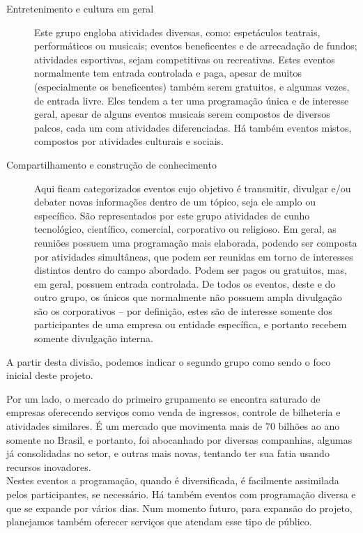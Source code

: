 \documentclass[12pt,a4paper,twoside,hyphens,english,brazil]{abntex2}
\begin{document}
\begin{description}
	\item[Entretenimento e cultura em geral]
	Este grupo engloba atividades diversas, como: espetáculos teatrais, performáticos ou musicais; eventos beneficentes e de arrecadação de fundos; atividades esportivas, sejam competitivas ou recreativas. Estes eventos normalmente tem entrada controlada e paga, apesar de muitos (especialmente os beneficentes) também serem gratuitos, e algumas vezes, de entrada livre. Eles tendem a ter uma programação única e de interesse geral, apesar de alguns eventos musicais serem compostos de diversos palcos, cada um com atividades diferenciadas. Há também eventos mistos, compostos por atividades culturais e sociais.

	\item[Compartilhamento e construção de conhecimento]
	Aqui ficam categorizados eventos cujo objetivo é transmitir, divulgar e/ou debater novas informações dentro de um tópico, seja ele amplo ou específico. São representados por este grupo atividades de cunho tecnológico, científico, comercial, corporativo ou religioso. Em geral, as reuniões possuem uma programação mais elaborada, podendo ser composta por atividades simultâneas, que podem ser reunidas em torno de interesses distintos dentro do campo abordado. Podem ser pagos ou gratuitos, mas, em geral, possuem entrada controlada. De todos os eventos, deste e do outro grupo, os únicos que normalmente não possuem ampla divulgação são os corporativos -- por definição, estes são de interesse somente dos participantes de uma empresa ou entidade específica, e portanto recebem somente divulgação interna.
\end{description}

A partir desta divisão, podemos indicar o segundo grupo como sendo o foco inicial deste projeto.

Por um lado, o mercado do primeiro grupamento se encontra saturado de empresas oferecendo serviços como venda de ingressos, controle de bilheteria e atividades similares. É um mercado que movimenta mais de 70 bilhões ao ano somente no Brasil\cite{pegn-mercado-eventos}, e portanto, foi abocanhado por diversas companhias, algumas já consolidadas no setor, e outras mais novas, tentando ter sua fatia usando recursos inovadores.\\
Nestes eventos a programação, quando é diversificada, é facilmente assimilada pelos participantes, se necessário. Há também eventos com programação diversa e que se expande por vários dias. Num momento futuro, para expansão do projeto, planejamos também oferecer serviços que atendam esse tipo de público.
\end{document}
